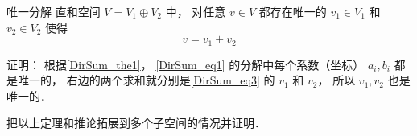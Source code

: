 \begin{theorem}{唯一分解}
直和空间 $V = V_1 \oplus V_2$ 中， 对任意 $v \in V$ 都存在唯一的 $v_1 \in V_1$ 和 $v_2 \in V_2$ 使得
\begin{equation}\label{DirSum_eq3}
v = v_1 + v_2
\end{equation}
\end{theorem}
证明： 根据\autoref{DirSum_the1}， \autoref{DirSum_eq1} 的分解中每个系数（坐标） $a_i, b_i$ 都是唯一的， 右边的两个求和就分别是\autoref{DirSum_eq3} 的 $v_1$ 和 $v_2$， 所以 $v_1, v_2$ 也是唯一的．

\begin{exercise}{}
把以上定理和推论拓展到多个子空间的情况并证明．
\end{exercise}

